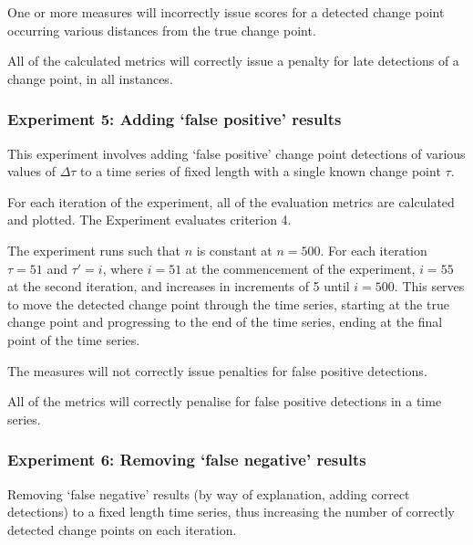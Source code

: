 \documentclass[../main.tex]{subfiles}
\begin{document}
\begin{hypothesis}
    One or more measures will incorrectly issue scores for a detected change point occurring various distances from the true change point.
\end{hypothesis}

\begin{nullhypothesis}
    All of the calculated metrics will correctly issue a penalty for late detections of a change point, in all instances.
\end{nullhypothesis}

\subsubsection{Experiment 5: Adding `false positive' results}

This experiment involves adding `false positive' change point detections of various values of $\Delta \tau$ to a time series of fixed length with a single known change point $\tau$.

For each iteration of the experiment, all of the evaluation metrics are calculated and plotted. The Experiment evaluates criterion 4.

The experiment runs such that $n$ is constant at $n=500$. For each iteration $\tau = 51$ and $\tau' = i$, where $i = 51$ at the commencement of the experiment, $i=55$ at the second iteration, and increases in increments of 5 until $i = 500$. This serves to move the detected change point through the time series, starting at the true change point and progressing to the end of the time series, ending at the final point of the time series.

\begin{hypothesis}
    The measures will not correctly issue penalties for false positive detections.
\end{hypothesis}

\begin{nullhypothesis}
    All of the metrics will correctly penalise for false positive detections in a time series.
\end{nullhypothesis}

\subsubsection{Experiment 6: Removing `false negative' results}

Removing `false negative' results (by way of explanation, adding correct detections) to a fixed length time series, thus increasing the number of correctly detected change points on each iteration.
\end{document}
